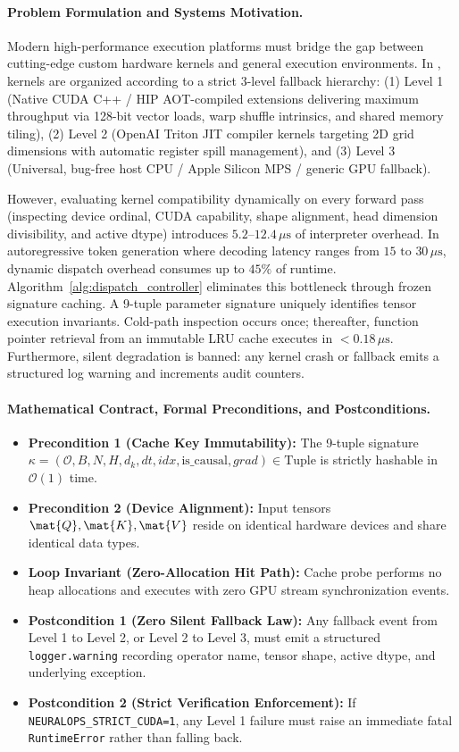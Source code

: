 \paragraph{Problem Formulation and Systems Motivation.}
Modern high-performance execution platforms must bridge the gap between cutting-edge custom hardware kernels and general execution environments. In \neuralops{}, kernels are organized according to a strict 3-level fallback hierarchy: (1) Level 1 (Native CUDA C++ / HIP AOT-compiled extensions delivering maximum throughput via 128-bit vector loads, warp shuffle intrinsics, and shared memory tiling), (2) Level 2 (OpenAI Triton JIT compiler kernels targeting 2D grid dimensions with automatic register spill management), and (3) Level 3 (Universal, bug-free host CPU / Apple Silicon MPS / generic GPU fallback).

However, evaluating kernel compatibility dynamically on every forward pass (inspecting device ordinal, CUDA capability, shape alignment, head dimension divisibility, and active dtype) introduces $5.2\text{--}12.4\,\mu\text{s}$ of interpreter overhead. In autoregressive token generation where decoding latency ranges from $15\text{ to }30\,\mu\text{s}$, dynamic dispatch overhead consumes up to $45\%$ of runtime. Algorithm~\ref{alg:dispatch_controller} eliminates this bottleneck through frozen signature caching. A 9-tuple parameter signature uniquely identifies tensor execution invariants. Cold-path inspection occurs once; thereafter, function pointer retrieval from an immutable LRU cache executes in $<0.18\,\mu\text{s}$. Furthermore, silent degradation is banned: any kernel crash or fallback emits a structured log warning and increments audit counters.

\paragraph{Mathematical Contract, Formal Preconditions, and Postconditions.}
\begin{itemize}
    \item \textbf{Precondition 1 (Cache Key Immutability):} The 9-tuple signature $\kappa = (\mathcal{O}, B, N, H, d_k, dt, idx, \text{is\_causal}, grad) \in \text{Tuple}$ is strictly hashable in $\mathcal{O}(1)$ time.
    \item \textbf{Precondition 2 (Device Alignment):} Input tensors $\mat{Q}, \mat{K}, \mat{V}$ reside on identical hardware devices and share identical data types.
    \item \textbf{Loop Invariant (Zero-Allocation Hit Path):} Cache probe performs no heap allocations and executes with zero GPU stream synchronization events.
    \item \textbf{Postcondition 1 (Zero Silent Fallback Law):} Any fallback event from Level 1 to Level 2, or Level 2 to Level 3, must emit a structured \texttt{logger.warning} recording operator name, tensor shape, active dtype, and underlying exception.
    \item \textbf{Postcondition 2 (Strict Verification Enforcement):} If \texttt{NEURALOPS\_STRICT\_CUDA=1}, any Level 1 failure must raise an immediate fatal \texttt{RuntimeError} rather than falling back.
\end{itemize}

